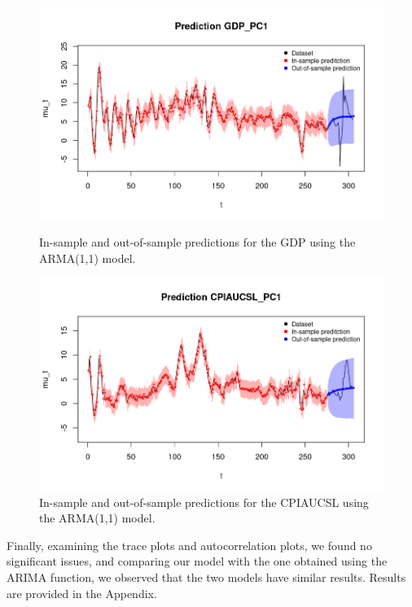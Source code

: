 \begin{figure}[H]
    \centering
    \begin{minipage}{0.5\textwidth}
        \centering
        \includegraphics[width=\textwidth]{images/4-ARMA/gdp_prediction.png}
        \caption{In-sample and out-of-sample predictions for the GDP using the ARMA(1,1) model.}
        \label{fig:ARMA1,1_gdp_prediction}
    \end{minipage}\hfill
    \begin{minipage}{0.5\textwidth}
        \centering
        \includegraphics[width=\textwidth]{images/4-ARMA/infl_prediction.png}
        \caption{In-sample and out-of-sample predictions for the CPIAUCSL using the ARMA(1,1) model.}
        \label{fig:ARMA1,1_infl_prediction}
    \end{minipage}
\end{figure}
Finally, examining the trace plots and autocorrelation plots, we found no significant issues, and comparing our model with the one obtained using the ARIMA function, we observed that the two models have similar results. Results are provided in the Appendix.